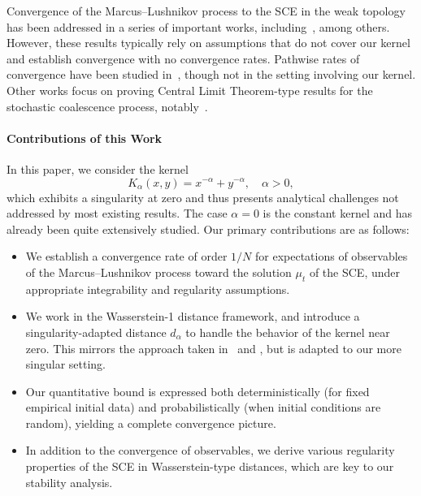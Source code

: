 \documentclass[11pt,a4paper]{article}
\begin{document}
Convergence of the Marcus–Lushnikov process to the SCE in the weak topology has been addressed in a series of important works, including~\cite{fournierConvergenceMarcusLushnikov2004,fournierStochasticCoalescenceHomogeneouslike2009,fournierDistanceCoagulation2006}, among others. However, these results typically rely on assumptions that do not cover our kernel and establish convergence with no convergence rates. Pathwise rates of convergence have been studied in~\cite{cepedaSmoluchowskisEquationRate2011a}, though not in the setting involving our kernel. Other works focus on proving Central Limit Theorem-type results for the stochastic coalescence process, notably~\cite{deaconuPureJumpMarkov2002,kolokoltsov2010central,kyprianouUniversalityClassFragmentationcoalescence2018}.
\paragraph{Contributions of this Work}

In this paper, we consider the kernel
\[
    K_\alpha(x,y) = x^{-\alpha} + y^{-\alpha}, \quad \alpha > 0,
\]
which exhibits a singularity at zero and thus presents analytical challenges not addressed by most existing results. The case $\alpha = 0$ is the constant kernel and has already been quite extensively studied. Our primary contributions are as follows:

\begin{itemize}
    \item We establish a convergence rate of order $1/N$ for expectations of observables of the Marcus–Lushnikov process toward the solution $\mu_t$ of the SCE, under appropriate integrability and regularity assumptions.
    \item We work in the Wasserstein-1 distance framework, and introduce a singularity-adapted distance $d_\alpha$ to handle the behavior of the kernel near zero. This mirrors the approach taken in~\cite{fournier2015rate} and \cite{cepedaSmoluchowskisEquationRate2011a}, but is adapted to our more singular setting.
    \item Our quantitative bound is expressed both deterministically (for fixed empirical initial data) and probabilistically (when initial conditions are random), yielding a complete convergence picture.
    \item In addition to the convergence of observables, we derive various regularity properties of the SCE in Wasserstein-type distances, which are key to our stability analysis.
\end{itemize}
\end{document}
